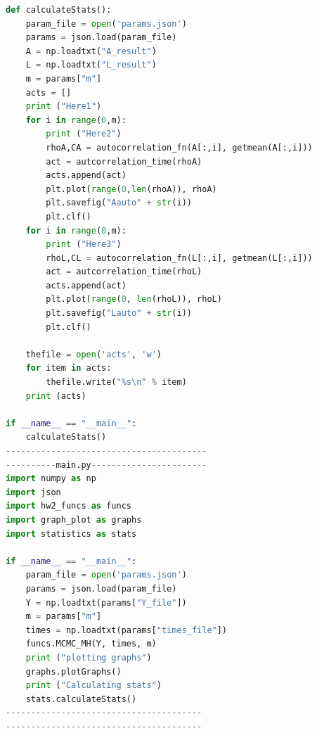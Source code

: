 \documentclass{article}
\begin{document}
\begin{lstlisting}[language=Python]
def calculateStats():
    param_file = open('params.json')
    params = json.load(param_file)
    A = np.loadtxt("A_result")
    L = np.loadtxt("L_result")
    m = params["m"]
    acts = []
    print ("Here1")
    for i in range(0,m):
        print ("Here2")
        rhoA,CA = autocorrelation_fn(A[:,i], getmean(A[:,i]))
        act = autcorrelation_time(rhoA)
        acts.append(act)
        plt.plot(range(0,len(rhoA)), rhoA)
        plt.savefig("Aauto" + str(i))
        plt.clf()
    for i in range(0,m):
        print ("Here3")
        rhoL,CL = autocorrelation_fn(L[:,i], getmean(L[:,i]))
        act = autcorrelation_time(rhoL)
        acts.append(act)
        plt.plot(range(0, len(rhoL)), rhoL)
        plt.savefig("Lauto" + str(i))
        plt.clf()

    thefile = open('acts', 'w')
    for item in acts:
        thefile.write("%s\n" % item)
    print (acts)

if __name__ == "__main__":
    calculateStats()
----------------------------------------
----------main.py-----------------------
import numpy as np
import json
import hw2_funcs as funcs
import graph_plot as graphs
import statistics as stats

if __name__ == "__main__":
    param_file = open('params.json')
    params = json.load(param_file)
    Y = np.loadtxt(params["Y_file"])
    m = params["m"]
    times = np.loadtxt(params["times_file"])
    funcs.MCMC_MH(Y, times, m)
    print ("plotting graphs")
    graphs.plotGraphs()
    print ("Calculating stats")
    stats.calculateStats()
---------------------------------------
---------------------------------------   

\end{lstlisting}
\end{document}
